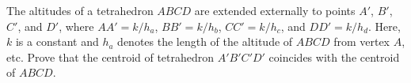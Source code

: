 The altitudes of a tetrahedron $ABCD$ are extended externally to points $A'$,  $B'$,  $C'$,  and $D'$,  where $AA' = k/h_a$,  $BB' = k/h_b$,  $CC' = k/h_c$,  and $DD' = k/h_d$.  Here, $k$ is a constant and $h_a$ denotes the length of the altitude of $ABCD$ from vertex $A$,  etc.  Prove that the centroid of tetrahedron $A'B'C'D'$ coincides with the centroid of $ABCD$.
